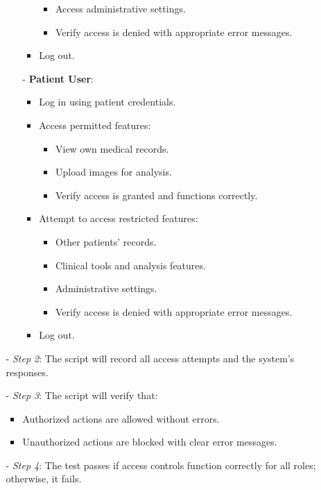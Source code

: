 \documentclass[12pt, titlepage]{article}
\begin{document}
\begin{enumerate}
\begin{itemize}
\begin{itemize}
\begin{itemize}
\begin{itemize}
              \item Access administrative settings.
              \item Verify access is denied with appropriate error messages.
            \end{itemize}
          \item Log out.
        \end{itemize}
      \item[-] \textbf{Patient User}:
        \begin{itemize}
          \item Log in using patient credentials.
          \item Access permitted features:
            \begin{itemize}
              \item View own medical records.
              \item Upload images for analysis.
              \item Verify access is granted and functions correctly.
            \end{itemize}
          \item Attempt to access restricted features:
            \begin{itemize}
              \item Other patients' records.
              \item Clinical tools and analysis features.
              \item Administrative settings.
              \item Verify access is denied with appropriate error messages.
            \end{itemize}
          \item Log out.
        \end{itemize}
    \end{itemize}
  \item[-] \textit{Step 2}: The script will record all access attempts and the system's responses.
  \item[-] \textit{Step 3}: The script will verify that:
    \begin{itemize}
      \item Authorized actions are allowed without errors.
      \item Unauthorized actions are blocked with clear error messages.
    \end{itemize}
  \item[-] \textit{Step 4}: The test passes if access controls function correctly for all roles; otherwise, it fails.
\end{itemize}

\end{enumerate}
\end{document}
